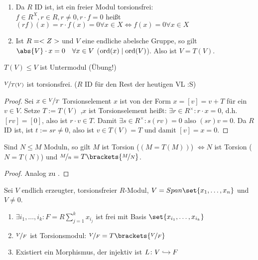 \begin{example}
	\begin{enumerate}
		\item Da $R$ ID ist, ist ein freier Modul torsionsfrei:\\
		$f \in R^X, r \in R, r \neq 0, r \cdot f = 0$ heißt $(rf)(x) = r \cdot f(x) = 0 \forall x \in X \Leftrightarrow f(x) = 0 \forall x \in X$
		\item Ist $R = <Z>$ und $V$ eine endliche abelsche Gruppe, so gilt $\abs{V}\cdot x = 0\quad \forall x \in V$ ($\operatorname{ord}(x) \mid \operatorname{ord}(V)$). Also ist $V = T(V)$.
	\end{enumerate}
\end{example}
\begin{*remark}
	$T(V) \le V$ ist Untermodul (Übung!)
\end{*remark}
\begin{lemma}
	$\lnkset{V}{T(V)}$ ist torsionsfrei. ($R$ ID für den Rest der heutigen VL :S)
\end{lemma}
\begin{proof}
	Sei $x \in \lnkset{V}{T}$ Torsionselement $x$ ist von der Form $x = [v] = v + T$ für ein $v\in V$. Setze $T := T(V)$ ,$x$ ist Torsionselement heißt: $\exists r \in R^{\times}\colon r \cdot x = 0$, d.h. $[rv] = [0]$, also ist $r \cdot v \in T$. Damit $\exists s \in R^{\times}\colon s(rv) = 0$ also $(sr)v = 0$. Da $R$ ID ist, ist $t:= sr \neq 0$, also ist $v \in T(V) = T$ und damit $[v] = x = 0$.
\end{proof}
\begin{lemma}
	Sind $N \le M$ Moduln, so gilt $M$ ist Torsion ($(M = T(M))$) $\Leftrightarrow N$ ist Torsion ($N = T(N)$) und $\lnkset{M}{n} = T\brackets{\lnkset{M}{N}}$.
\end{lemma}
\begin{proof}
	Analog zu .
\end{proof}
\begin{proposition}
	Sei $V$ endlich erzeugter, torsionsfreier $R$-Modul, $V = Span\set{x_1, \dots, x_n}$ und $V \neq 0$.
	\begin{enumerate}
		\item $\exists i_1, \dots, i_k \colon F = R\sum_{j=1}^k x_{i_j}$ ist frei mit Basis $\set{x_{i_1}, \dots, x_{i_k}}$
		\item $\lnkset{V}{F}$ ist Torsionsmodul: $\lnkset{V}{F} = T\brackets{\lnkset{V}{F}}$
		\item Existiert ein Morphismus, der injektiv ist $L \colon \begin{tikzcd}[cramped, sep=small]
		V \arrow[r, hook] & F
		\end{tikzcd}$
	\end{enumerate}
\end{proposition}

